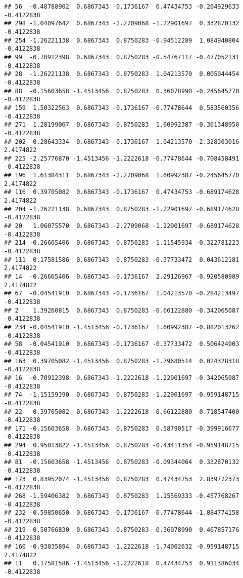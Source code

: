 \documentclass[
]{article}
\begin{document}
\begin{verbatim}
## 56  -0.48788902  0.6867343 -0.1736167  0.47434753 -0.264929633 -0.4122838
## 298 -1.04097642  0.6867343 -2.2709068 -1.22901697  0.332870132 -0.4122838
## 254 -1.26221138  0.6867343  0.8750283 -0.94512289  1.084940804 -0.4122838
## 99  -0.70912398  0.6867343  0.8750283 -0.54767117 -0.477052131 -0.4122838
## 28  -1.26221138  0.6867343  0.8750283  1.04213570  0.005044454 -0.4122838
## 88  -0.15603658 -1.4513456  0.8750283  0.36078990 -0.245645770 -0.4122838
## 159  1.50322563  0.6867343 -0.1736167 -0.77478644  0.583560356 -0.4122838
## 271  1.28199067  0.6867343  0.8750283  1.60992387 -0.361348950 -0.4122838
## 202  0.28643334  0.6867343 -0.1736167  1.04213570 -2.328303016  2.4174822
## 225 -2.25776870 -1.4513456 -1.2222618 -0.77478644 -0.708458491 -0.4122838
## 196  1.61384311  0.6867343 -2.2709068  1.60992387 -0.245645770  2.4174822
## 116  0.39705082  0.6867343 -0.1736167  0.47434753 -0.689174628  2.4174822
## 204 -1.26221138  0.6867343  0.8750283 -1.22901697 -0.689174628 -0.4122838
## 20   1.06075570  0.6867343 -2.2709068 -1.22901697 -0.689174628 -0.4122838
## 214 -0.26665406  0.6867343  0.8750283 -1.11545934 -0.322781223 -0.4122838
## 111  0.17581586  0.6867343  0.8750283 -0.37733472  0.043612181  2.4174822
## 14  -0.26665406  0.6867343 -0.1736167  2.29126967 -0.920580989  2.4174822
## 67  -0.04541910  0.6867343 -0.1736167  1.04213570 -0.284213497 -0.4122838
## 2    1.39260815  0.6867343  0.8750283 -0.66122880 -0.342065087 -0.4122838
## 234 -0.04541910 -1.4513456 -0.1736167  1.60992387 -0.882013262 -0.4122838
## 58  -0.04541910  0.6867343 -0.1736167 -0.37733472  0.506424903 -0.4122838
## 163  0.39705082 -1.4513456  0.8750283 -1.79680514  0.024328318 -0.4122838
## 16  -0.70912398  0.6867343 -1.2222618 -1.22901697 -0.342065087 -0.4122838
## 74  -1.15159390  0.6867343  0.8750283 -1.22901697 -0.959148715 -0.4122838
## 22   0.39705082  0.6867343 -1.2222618 -0.66122880  0.718547400 -0.4122838
## 171 -0.15603658  0.6867343  0.8750283  0.58790517 -0.399916677 -0.4122838
## 294  0.95013822 -1.4513456  0.8750283 -0.43411354 -0.959148715 -0.4122838
## 81  -0.15603658 -1.4513456  0.8750283 -0.09344064  0.332870132 -0.4122838
## 173  0.83952074 -1.4513456  0.8750283  0.47434753  2.839772373 -0.4122838
## 268 -1.59406382  0.6867343  0.8750283  1.15569333 -0.457768267 -0.4122838
## 232 -0.59850650  0.6867343 -0.1736167 -0.77478644 -1.884774158 -0.4122838
## 219  0.50766830  0.6867343  0.8750283  0.36078990  0.467857176 -0.4122838
## 160 -0.93035894  0.6867343 -1.2222618 -1.74002632 -0.959148715  2.4174822
## 11   0.17581586 -1.4513456 -1.2222618  0.47434753  0.911386034 -0.4122838

\end{verbatim}
\end{document}

